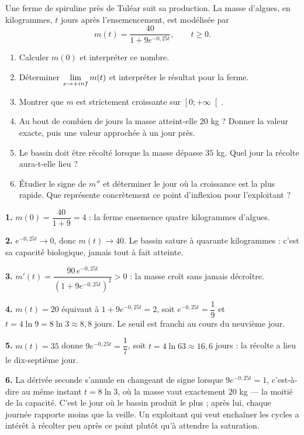 \begin{jecherche}
Une ferme de spiruline près de Tuléar suit sa production. La masse d'algues,
en kilogrammes, $t$ jours après l'ensemencement, est modélisée par
\[
  m(t) = \frac{40}{1+9e^{-0{,}25t}}, \qquad t \geq 0 .
\]

\begin{enumerate}[label=\textbf{\arabic*.}, leftmargin=*, itemsep=0.3em]
  \item Calculer $m(0)$ et interpréter ce nombre.
  \item Déterminer $\limpinf m(t)$ et interpréter le résultat pour la ferme.
  \item Montrer que $m$ est strictement croissante sur $\left[0;+\infty\right[$.
  \item Au bout de combien de jours la masse atteint-elle $20$ kg ? Donner la
        valeur exacte, puis une valeur approchée à un jour près.
  \item Le bassin doit être récolté lorsque la masse dépasse $35$ kg. Quel jour
        la récolte aura-t-elle lieu ?
  \item Étudier le signe de $m''$ et déterminer le jour où la croissance est la
        plus rapide. Que représente concrètement ce point d'inflexion pour
        l'exploitant ?
\end{enumerate}
\end{jecherche}

\begin{corrige}
\textbf{1.} $m(0) = \dfrac{40}{1+9} = 4$ : la ferme ensemence quatre
kilogrammes d'algues.

\textbf{2.} $e^{-0{,}25t} \to 0$, donc $m(t) \to 40$. Le bassin sature à
quarante kilogrammes : c'est sa capacité biologique, jamais tout à fait
atteinte.

\textbf{3.} $m'(t) = \dfrac{90\,e^{-0{,}25t}}{\left(1+9e^{-0{,}25t}\right)^{2}} > 0$ :
la masse croît sans jamais décroître.

\textbf{4.} $m(t) = 20$ équivaut à $1+9e^{-0{,}25t} = 2$, soit
$e^{-0{,}25t} = \dfrac19$ et $t = 4\ln 9 = 8\ln 3 \approx 8{,}8$ jours. Le
seuil est franchi au cours du neuvième jour.

\textbf{5.} $m(t) = 35$ donne $9e^{-0{,}25t} = \dfrac17$, soit
$t = 4\ln 63 \approx 16{,}6$ jours : la récolte a lieu le dix-septième jour.

\textbf{6.} La dérivée seconde s'annule en changeant de signe lorsque
$9e^{-0{,}25t} = 1$, c'est-à-dire au même instant $t = 8\ln 3$, où la masse
vaut exactement $20$ kg — la moitié de la capacité. C'est le jour où le
bassin produit le plus ; après lui, chaque journée rapporte moins que la
veille. Un exploitant qui veut enchaîner les cycles a intérêt à récolter peu
après ce point plutôt qu'à attendre la saturation.
\end{corrige}


